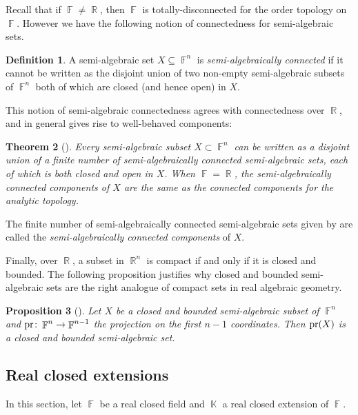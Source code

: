 \documentclass{amsart}
\theoremstyle{plain}
\newtheorem{proposition}{Proposition}[section]
\newtheorem{theorem}[proposition]{Theorem}
\theoremstyle{definition}
\newtheorem{definition}[proposition]{Definition}
\DeclareMathOperator{\Fb}{{\mathbb{F}}}
\DeclareMathOperator{\Kb}{\mathbb{K}}
\DeclareMathOperator{\Rb}{{\mathbb{R}}}
\newcommand*\from{\colon}
\newcommand{\pr}{\textnormal{pr}}
\newcommand{\1}{\mathbf{1}}
\begin{document}
Recall that if $\Fb\neq \Rb$, then $\Fb$ is totally-disconnected for the order topology on $\Fb$.
However we have the following notion of connectedness for semi-algebraic sets.

\begin{definition} \label{dfn_SemiAlgConn}
A semi-algebraic set $X \subseteq \Fb^n$ is \emph{semi-algebraically connected} if it cannot be written as the disjoint union of two non-empty semi-algebraic subsets of $\Fb^n$ both of which are closed (and hence open) in $X$. 
\end{definition}

This notion of semi-algebraic connectedness agrees with connectedness over $\Rb$, and in general gives rise to well-behaved components:

\begin{theorem}[{\cite[Theorem 2.4.4 and Theorem 2.4.5]{BochnakCosteRoy_RealAlgebraicGeometry}}]
\label{thm_RConnSemiAlgConn}
Every semi-algebraic subset $X\subset\Fb^n$ can be written as a disjoint union of a finite number of semi-algebraically connected semi-algebraic sets, each of which is both closed and open in $X$.
When $\Fb=\Rb$, the semi-algebraically connected components of $X$ are the same as the connected components for the analytic topology.
\end{theorem}

The finite number of semi-algebraically connected semi-algebraic sets given by  are called the \emph{semi-algebraically connected components} of $X$.

Finally, over $\Rb$, a subset in $\Rb^n$ is compact if and only if it is closed and bounded.
The following proposition justifies why closed and bounded semi-algebraic sets are the right analogue of compact sets in real algebraic geometry.
\begin{proposition}[{\cite[Proposition 2.5.7]{BochnakCosteRoy_RealAlgebraicGeometry}}]
\label{propo_ProjClosedBd}
    Let $X$ be a closed and bounded semi-algebraic subset of $\Fb^n$ and $\pr\from \Fb^n \to \Fb^{n-1}$ the projection on the first $n-1$ coordinates. 
    Then $\pr(X)$ is a closed and bounded semi-algebraic set.
\end{proposition}


\subsection{Real closed extensions}
\label{s: extensions semi-algebraic sets}
In this section, let $\Fb$ be a real closed field and $\Kb$ a real closed extension of $\Fb$. 
\end{document}
